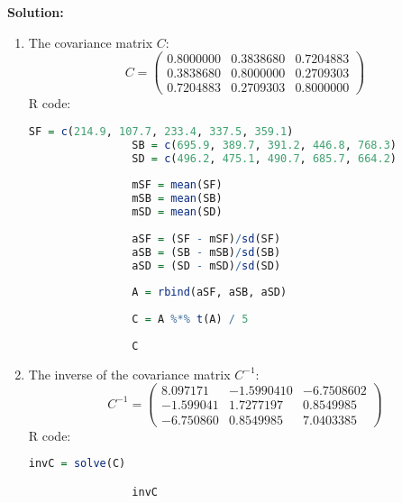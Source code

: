 \documentclass[12pt]{article}
\newenvironment{solution}{
    \textbf{Solution:}
    
}{
    
    \vspace{2em}
}
\begin{document}
\begin{solution}
    \begin{enumerate}[label=(\alph*)]
        \item The covariance matrix $C$:
            \[
            C = \begin{pmatrix}
                0.8000000 & 0.3838680 & 0.7204883 \\
                0.3838680 & 0.8000000 & 0.2709303 \\
                0.7204883 & 0.2709303 & 0.8000000
            \end{pmatrix}
            \]
            R code:
            \begin{lstlisting}[language=R]
                SF = c(214.9, 107.7, 233.4, 337.5, 359.1)
                SB = c(695.9, 389.7, 391.2, 446.8, 768.3)
                SD = c(496.2, 475.1, 490.7, 685.7, 664.2)
                
                mSF = mean(SF)
                mSB = mean(SB)
                mSD = mean(SD)
                
                aSF = (SF - mSF)/sd(SF)
                aSB = (SB - mSB)/sd(SB)
                aSD = (SD - mSD)/sd(SD)
                
                A = rbind(aSF, aSB, aSD)
                
                C = A %*% t(A) / 5
                
                C
            \end{lstlisting}
        
        \item The inverse of the covariance matrix $C^{-1}$:
            \[
            C^{-1} = \begin{pmatrix}
                8.097171 & -1.5990410 & -6.7508602 \\
                -1.599041 & 1.7277197 & 0.8549985 \\
                -6.750860 & 0.8549985 & 7.0403385
            \end{pmatrix}
            \]
            R code:
            \begin{lstlisting}[language=R]
                invC = solve(C)

                invC
            \end{lstlisting}
        


\end{enumerate}
\end{solution}
\end{document}
